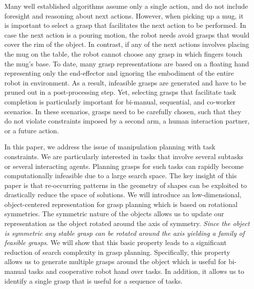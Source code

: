 \documentclass{aamas2015}
\begin{document}
Many well established algorithms assume only a single action, 
and do not include foresight and reasoning about next 
actions. However, when picking up a mug, it is 
important to select a grasp that facilitates
the next action to be performed. In case the next action 
is a pouring motion, the robot needs avoid grasps that would 
cover the rim of the object. In contrast, if any of the 
next actions involves placing the mug on the table, the 
robot cannot choose any grasp in which fingers touch 
the mug's base. To date, many grasp representations 
are based on a floating hand representing only the 
end-effector and ignoring the embodiment of the 
entire robot in environment. As a result, infeasible grasps 
are generated and have to be pruned out in a post-processing 
step. Yet, selecting grasps that facilitate task completion is 
particularly important for bi-manual, sequential, 
and co-worker scenarios. In these scenarios, grasps
need to be carefully chosen, such that they do not violate
constraints imposed by a second arm, a human interaction
partner, or a future action. 

In this paper, we address the issue of manipulation planning with task
constraints. We are particularly interested in tasks that involve several
subtasks or several interacting agents. Planning grasps for such 
tasks can rapidly become computationally infeasible due to a large
search space. The key insight of this paper is that re-occurring
patterns in the geometry of shapes can be exploited to drastically
reduce the space of solutions. We will introduce an low-dimensional, 
object-centered representation for grasp planning which is based on rotational symmetries.
The symmetric nature of the objects allows us to update our representation
as the object rotated around the axis of symmetry. \emph{Since the object is symmetric any stable grasp can be rotated around the axis yielding a family of feasible grasps}. We will show that this basic property leads to a significant reduction of search complexity in grasp planning. Specifically, this property allows us to generate multiple grasps around the object which is useful for bi-manual tasks and cooperative robot hand over tasks. In addition, it allows us to identify a single grasp that is useful for a sequence of tasks.
\end{document}
